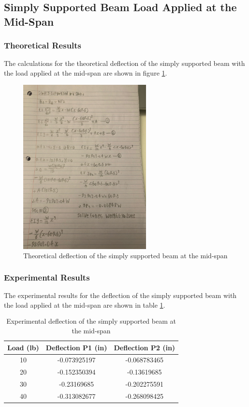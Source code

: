 \documentclass[12pt, titlepage]{article}
\begin{document}
\subsection{Simply Supported Beam Load Applied at the Mid-Span}
\subsubsection{Theoretical Results}
The calculations for the theoretical deflection of the simply supported beam
with the load applied at the mid-span are shown in figure
\ref{fig:TheoreticalSimplySupportedBeamMid}.
\begin{figure}[H]
    \centering
    \includegraphics[width=0.6\textwidth]{./Images/S_M.jpeg}
    \caption{Theoretical deflection of the simply supported beam at the mid-span}
    \label{fig:TheoreticalSimplySupportedBeamMid}
\end{figure}
\newpage
\subsubsection{Experimental Results}
The experimental results for the deflection of the simply supported beam with
the load applied at the mid-span are shown in table
\ref{tab:ExperimentalSimplySupportedBeamMid}.
\begin{table}[H]
    \centering
    \caption{Experimental deflection of the simply supported beam at the mid-span}
    \label{tab:ExperimentalSimplySupportedBeamMid}
    \begin{tabular}{|c|c|c|}
        \hline
        \textbf{Load (lb)} & \textbf{Deflection P1 (in)} & \textbf{Deflection P2 (in)}\\
        \hline
        10 & -0.073925197 & -0.068783465 \\
        \hline
        20 & -0.152350394 & -0.13619685 \\
        \hline
        30 & -0.23169685 & -0.202275591 \\
        \hline
        40 & -0.313082677 & -0.268098425 \\
        \hline
    \end{tabular}
\end{table}
\end{document}
